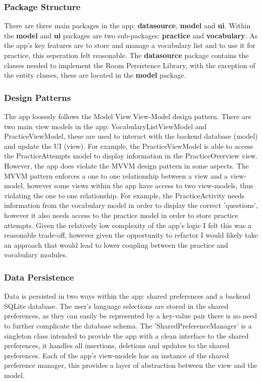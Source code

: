 \documentclass[runningheads]{llncs}
\begin{document}
	\subsubsection{Package Structure}
	There are three main packages in the app: \textbf{datasource}, \textbf{model} and \textbf{ui}. Within the \textbf{model} and \textbf{ui} packages are two sub-packages: \textbf{practice} and \textbf{vocabulary}. As the app's key features are to store and manage a vocabulary list and to use it for practice, this seperation felt reasonable. The \textbf{datasource} package contains the classes needed to implement the Room Persistence Library, with the exception of the entity classes, these are located in the \textbf{model} package.
	
	\subsubsection{Design Patterns}
	The app loosesly follows the Model View View-Model design pattern. There are two main view models in the app: VocabularyListViewModel and PracticeViewModel, these are used to interact with the backend database (model) and update the UI (view). For example, the PracticeViewModel is able to access the PracticeAttempts model to display information in the PracticeOverview view. However, the app does violate the MVVM design pattern in some aspects. The MVVM pattern enforces a one to one relationship between a view and a view-model, however some views within the app have access to two view-models, thus violating the one to one relationship. For example, the PracticeActivity needs information from the vocabulary model in order to display the correct 'questions', however it also needs access to the practice model in order to store practice attempts. Given the relatively low complexity of the app's logic I felt this was a reasonable trade-off, however given the opportunity to refactor I would likely take an approach that would lead to lower coupling between the practice and vocabulary modules.
	
	\subsubsection{Data Persistence}
	Data is persisted in two ways within the app: shared preferences and a backend SQLite database. The user's language selections are stored in the shared preferences, as they can easily be represented by a key-value pair there is no need to further complicate the database schema. The 'SharedPreferenceManager' is a singleton class intended to provide the app with a clean interface to the shared preferences, it handles all insertions, deletions and updates to the shared preferences. Each of the app's view-models has an instance of the shared preference manager, this provides a layer of abstraction between the view and the model. 
	
\end{document}
